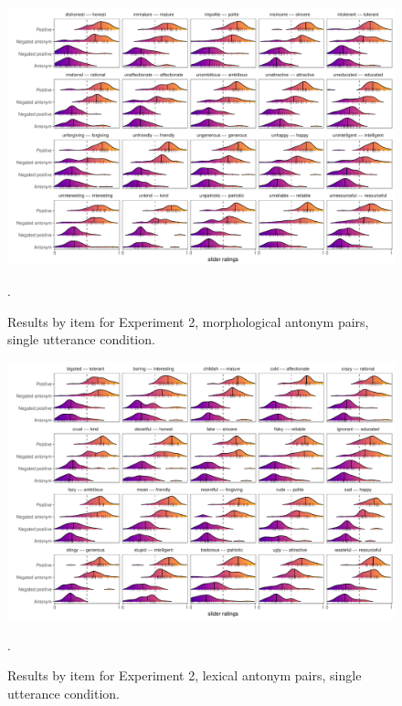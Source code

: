 \documentclass[floatsintext,doc]{apa6}
\begin{document}
\begin{figure}[t]
\centering \includegraphics{figs/cogsci_expt2_morph_singleUtt_byItem_densities.pdf} 
\caption{Results by item for Experiment 2, morphological antonym pairs, single utterance condition.}.\label{fig:items_morph_singleUtt_expt2}
\end{figure}

\begin{figure}[t]
\centering \includegraphics{figs/cogsci_expt2_lex_singleUtt_byItem_densities.pdf} 
\caption{Results by item for Experiment 2, lexical antonym pairs, single utterance condition.}.\label{fig:items_lex_singleUtt_expt2}
\end{figure}
\end{document}
